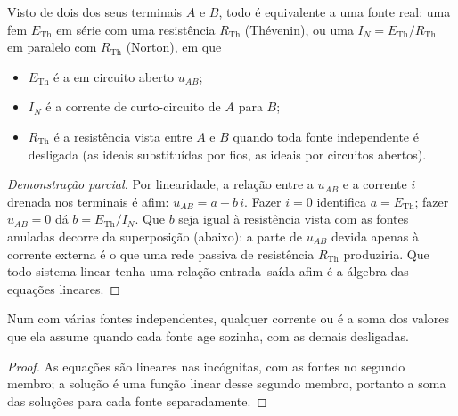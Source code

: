 \begin{theorem}\label{thm:b1:dc-circuits:thevenin}
Visto de dois dos seus terminais $A$ e $B$, todo  é
equivalente a uma fonte real: uma fem $E_{\mathrm{Th}}$ em série com uma
resistência $R_{\mathrm{Th}}$ (Thévenin), ou uma  $I_N =
E_{\mathrm{Th}}/R_{\mathrm{Th}}$ em paralelo com $R_{\mathrm{Th}}$
(Norton), em que
\begin{itemize}
  \item $E_{\mathrm{Th}}$ é a  em circuito aberto $u_{AB}$;
  \item $I_N$ é a corrente de curto-circuito de $A$ para $B$;
  \item $R_{\mathrm{Th}}$ é a resistência vista entre $A$ e $B$
        quando toda fonte independente é desligada (as 
        ideais substituídas por fios, as  ideais por
        circuitos abertos).
\end{itemize}
\end{theorem}

\begin{proof}[Demonstração parcial]
Por linearidade, a relação entre a  $u_{AB}$ e a corrente
$i$ drenada nos terminais é afim: $u_{AB} = a - b\,i$. Fazer
$i = 0$ identifica $a = E_{\mathrm{Th}}$; fazer $u_{AB} = 0$ dá
$b = E_{\mathrm{Th}}/I_N$. Que $b$ seja igual à resistência vista com as
fontes anuladas decorre da superposição (abaixo): a parte de $u_{AB}$
devida apenas à corrente externa é o que uma rede passiva de
resistência $R_{\mathrm{Th}}$ produziria. Que todo sistema linear tenha
uma relação entrada--saída afim é a álgebra das equações lineares.
\end{proof}

\begin{theorem}[Superposição]\label{thm:b1:dc-circuits:superposition}
Num  com várias fontes independentes, qualquer corrente ou
 é a soma dos valores que ela assume quando cada fonte age sozinha,
com as demais desligadas.
\end{theorem}

\begin{proof}
As equações são lineares nas incógnitas, com as fontes no
segundo membro; a solução é uma função linear desse segundo
membro, portanto a soma das soluções para cada fonte separadamente.
\end{proof}

